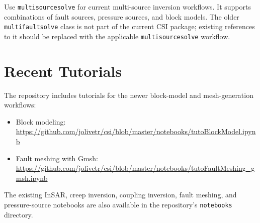 Use \texttt{multisourcesolve} for current multi-source inversion workflows. It supports combinations of fault sources, pressure sources, and block models. The older \texttt{multifaultsolve} class is not part of the current CSI package; existing references to it should be replaced with the applicable \texttt{multisourcesolve} workflow.

\section{Recent Tutorials}
\label{sec:recent-tutorials}

The repository includes tutorials for the newer block-model and mesh-generation workflows:

\begin{itemize}
  \item Block modeling: \url{https://github.com/jolivetr/csi/blob/master/notebooks/tutoBlockModel.ipynb}
  \item Fault meshing with Gmsh: \url{https://github.com/jolivetr/csi/blob/master/notebooks/tutoFaultMeshing_gmsh.ipynb}
\end{itemize}

The existing InSAR, creep inversion, coupling inversion, fault meshing, and pressure-source notebooks are also available in the repository's \texttt{notebooks} directory.
